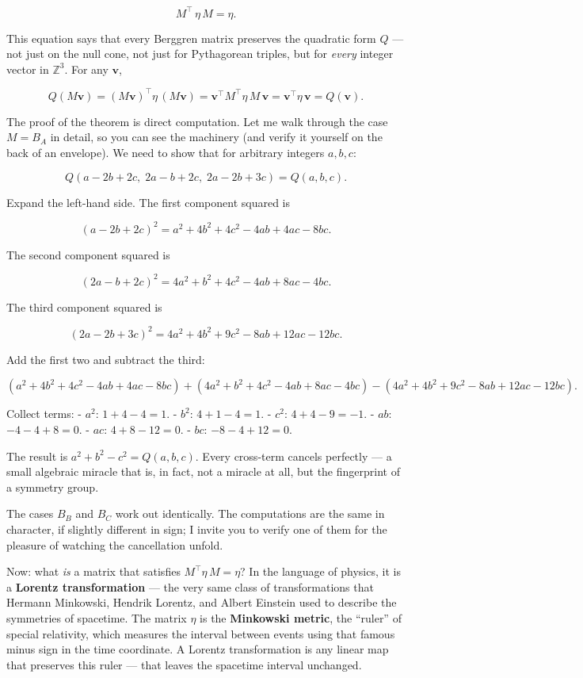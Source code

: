 \[M^{\!\top}\, \eta\, M = \eta.\]

This equation says that every Berggren matrix preserves the quadratic form \(Q\) --- not just on the null cone, not just for Pythagorean triples, but for \emph{every} integer vector in \(\mathbb{Z}^3\). For any \(\mathbf{v}\),

\[Q(M\mathbf{v}) = (M\mathbf{v})^\top \eta\, (M\mathbf{v}) = \mathbf{v}^\top M^\top \eta\, M\, \mathbf{v} = \mathbf{v}^\top \eta\, \mathbf{v} = Q(\mathbf{v}).\]

The proof of the theorem is direct computation. Let me walk through the case \(M = B_A\) in detail, so you can see the machinery (and verify it yourself on the back of an envelope). We need to show that for arbitrary integers \(a, b, c\):

\[Q(a - 2b + 2c,\; 2a - b + 2c,\; 2a - 2b + 3c) = Q(a, b, c).\]

Expand the left-hand side. The first component squared is

\[(a - 2b + 2c)^2 = a^2 + 4b^2 + 4c^2 - 4ab + 4ac - 8bc.\]

The second component squared is

\[(2a - b + 2c)^2 = 4a^2 + b^2 + 4c^2 - 4ab + 8ac - 4bc.\]

The third component squared is

\[(2a - 2b + 3c)^2 = 4a^2 + 4b^2 + 9c^2 - 8ab + 12ac - 12bc.\]

Add the first two and subtract the third:

\[(a^2 + 4b^2 + 4c^2 - 4ab + 4ac - 8bc) + (4a^2 + b^2 + 4c^2 - 4ab + 8ac - 4bc) - (4a^2 + 4b^2 + 9c^2 - 8ab + 12ac - 12bc).\]

Collect terms: - \(a^2\): \(1 + 4 - 4 = 1\). - \(b^2\): \(4 + 1 - 4 = 1\). - \(c^2\): \(4 + 4 - 9 = -1\). - \(ab\): \(-4 - 4 + 8 = 0\). - \(ac\): \(4 + 8 - 12 = 0\). - \(bc\): \(-8 - 4 + 12 = 0\).

The result is \(a^2 + b^2 - c^2 = Q(a, b, c)\). Every cross-term cancels perfectly --- a small algebraic miracle that is, in fact, not a miracle at all, but the fingerprint of a symmetry group.

The cases \(B_B\) and \(B_C\) work out identically. The computations are the same in character, if slightly different in sign; I invite you to verify one of them for the pleasure of watching the cancellation unfold.

Now: what \emph{is} a matrix that satisfies \(M^\top \eta\, M = \eta\)? In the language of physics, it is a \textbf{Lorentz transformation} --- the very same class of transformations that Hermann Minkowski, Hendrik Lorentz, and Albert Einstein used to describe the symmetries of spacetime. The matrix \(\eta\) is the \textbf{Minkowski metric}, the ``ruler'' of special relativity, which measures the interval between events using that famous minus sign in the time coordinate. A Lorentz transformation is any linear map that preserves this ruler --- that leaves the spacetime interval unchanged.

